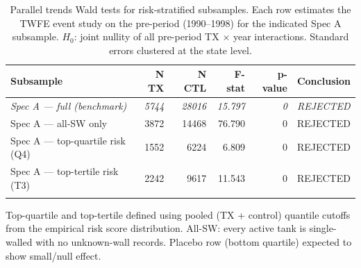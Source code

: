 \begin{table}[H]
\centering
\caption{\label{tab:tab:risk-pt-tests}Parallel trends Wald tests for risk-stratified subsamples. Each row estimates the TWFE event study on the pre-period (1990--1998) for the indicated Spec A subsample. $H_0$: joint nullity of all pre-period TX $\times$ year interactions. Standard errors clustered at the state level.}
\centering
\fontsize{10}{12}\selectfont
\begin{threeparttable}
\begin{tabular}[t]{lrrrrl}
\toprule
Subsample & N TX & N CTL & F-stat & p-value & Conclusion\\
\midrule
\em{Spec A — full (benchmark)} & \em{5744} & \em{28016} & \em{15.797} & \em{0} & \em{REJECTED}\\
Spec A — all-SW only & 3872 & 14468 & 76.790 & 0 & REJECTED\\
Spec A — top-quartile risk (Q4) & 1552 & 6224 & 6.809 & 0 & REJECTED\\
Spec A — top-tertile risk (T3) & 2242 & 9617 & 11.543 & 0 & REJECTED\\
\cellcolor{gray90}{Spec A — bottom-quartile risk (placebo)} & \cellcolor{gray90}{1407} & \cellcolor{gray90}{6332} & \cellcolor{gray90}{15.799} & \cellcolor{gray90}{0} & \cellcolor{gray90}{REJECTED}\\
\bottomrule
\end{tabular}
\begin{tablenotes}
\item Top-quartile and top-tertile defined using pooled (TX + control) quantile cutoffs from the empirical risk score distribution. All-SW: every active tank is single-walled with no unknown-wall records. Placebo row (bottom quartile) expected to show small/null effect.
\end{tablenotes}
\end{threeparttable}
\end{table}
